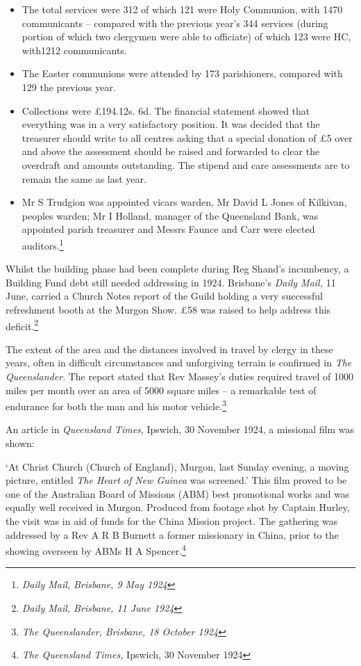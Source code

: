 \begin{itemize}
\item
  The total services were 312 of which 121 were Holy Communion, with
  1470 communicants -- compared with the previous year's 344 services
  (during portion of which two clergymen were able to officiate) of
  which 123 were HC, with1212 communicants.
\item
  The Easter communions were attended by 173 parishioners, compared with
  129 the previous year.
\item
  Collections were £194.12s. 6d. The financial statement showed that
  everything was in a very satisfactory position. It was decided that
  the treasurer should write to all centres asking that a special
  donation of £5 over and above the assessment should be raised and
  forwarded to clear the overdraft and amounts outstanding. The stipend
  and care assessments are to remain the same as last year.
\item
  Mr S Trudgion was appointed vicars warden, Mr David L Jones of
  Kilkivan, peoples warden; Mr I Holland, manager of the Queensland
  Bank, was appointed parish treasurer and Messrs Faunce and Carr were
  elected auditors.\footnote{\emph{Daily Mail, Brisbane, 9 May 1924}}
\end{itemize}

Whilst the building phase had been complete during Reg Shand's
incumbency, a Building Fund debt still needed addressing in 1924.
Brisbane's \emph{Daily Mail,} 11 June, carried a Church Notes report of
the Guild holding a very successful refreshment booth at the Murgon
Show. £58 was raised to help address this deficit.\footnote{\emph{Daily
  Mail, Brisbane, 11 June 1924}}

The extent of the area and the distances involved in travel by clergy in
these years, often in difficult circumstances and unforgiving terrain is
confirmed in \emph{The Queenslander}. The report stated that Rev
Massey's duties required travel of 1000 miles per month over an area of
5000 square miles -- a remarkable test of endurance for both the man and
his motor vehicle.\footnote{\emph{The Queenslander, Brisbane, 18 October
  1924}}

An article in \emph{Queensland Times}, Ipswich, 30 November 1924, a
missional film was shown:

`At Christ Church (Church of England), Murgon, last Sunday evening, a
moving picture, entitled \emph{The Heart of New Guinea} was screened.'
This film proved to be one of the Australian Board of Missions (ABM)
best promotional works and was equally well received in Murgon. Produced
from footage shot by Captain Hurley, the visit was in aid of funds for
the China Mission project\emph{.} The gathering was addressed by a Rev A
R B Burnett a former missionary in China, prior to the showing overseen
by ABMs H A Spencer.\footnote{\emph{The Queensland Times,} Ipswich, 30
  November 1924}

